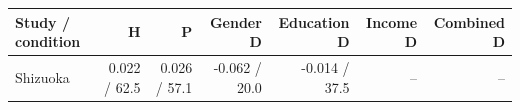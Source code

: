 
\begin{tabular}{lrrrrrr}
\toprule
Study / condition & H & P & Gender D & Education D & Income D & Combined D\\
\midrule
Shizuoka & 0.022 / 62.5 & 0.026 / 57.1 & -0.062 / 20.0 & -0.014 / 37.5 & -- & --\\
\bottomrule
\end{tabular}
